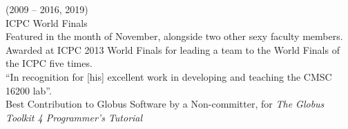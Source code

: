 \documentclass{resume}
\begin{document}
\begin{category}{}
 (2009 -- 2016, 2019)\\
ICPC World Finals
\\Featured in the month of November, alongside two other sexy faculty members.
\\Awarded at ICPC 2013 World Finals for leading a team to the World Finals of the ICPC five times.
\\``In recognition for [his] excellent work in developing and teaching the CMSC 16200 lab''.
\\Best Contribution to Globus Software by a Non-committer, for \emph{The Globus Toolkit 4 Programmer's Tutorial}
\end{category}
\end{document}

